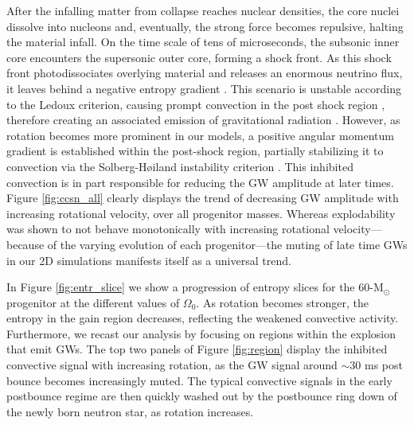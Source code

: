 \documentclass[twocolumn,times]{aastex62}  %
\newcommand{\Msun}{\ensuremath{\mathrm{M}_\odot}\xspace}
\begin{document}
After the infalling matter from collapse reaches nuclear densities, the core nuclei dissolve into nucleons and, eventually, the strong force becomes repulsive, halting the material infall.  On the time scale of tens of microseconds, the subsonic inner core encounters the supersonic outer core, forming a shock front.  As this shock front photodissociates overlying material and releases an enormous neutrino flux, it leaves behind a negative entropy gradient \citep{mazurek:1982,bruenn:1985,bruenn:1989}.  This scenario is unstable according to the Ledoux criterion, causing prompt convection in the post shock region \citep{burrows:1992}, therefore creating an associated emission of gravitational radiation \citep{marek:2009b,ott:2009}.  However, as rotation becomes more prominent in our models, a positive angular momentum gradient is established within the post-shock region, partially stabilizing it to convection via the Solberg-H{\o}iland instability criterion \citep{endal:1978,fryer:2000}.  This inhibited convection is in part responsible for reducing the GW amplitude at later times.  Figure \ref{fig:ccsn_all} clearly displays the trend of decreasing GW amplitude with increasing rotational velocity, over all progenitor masses.  Whereas explodability was shown to not behave monotonically with increasing rotational velocity---because of the varying evolution of each progenitor---the muting of late time GWs in our 2D simulations manifests itself as a universal trend.
 
In Figure \ref{fig:entr_slice} we show a progression of entropy slices  for the 60-\Msun progenitor at the different values of $\Omega_0$.  As rotation becomes stronger, the entropy in the gain region decreases, reflecting the weakened convective activity.  Furthermore, we recast our analysis by focusing on regions within the explosion that emit GWs.  The top two panels of Figure \ref{fig:region} display the inhibited convective signal with increasing rotation, as the GW signal around $\sim$30 ms post bounce becomes increasingly muted.  The typical convective signals in the early postbounce regime are then quickly washed out by the postbounce ring down of the newly born neutron star, as rotation increases.
\end{document}
